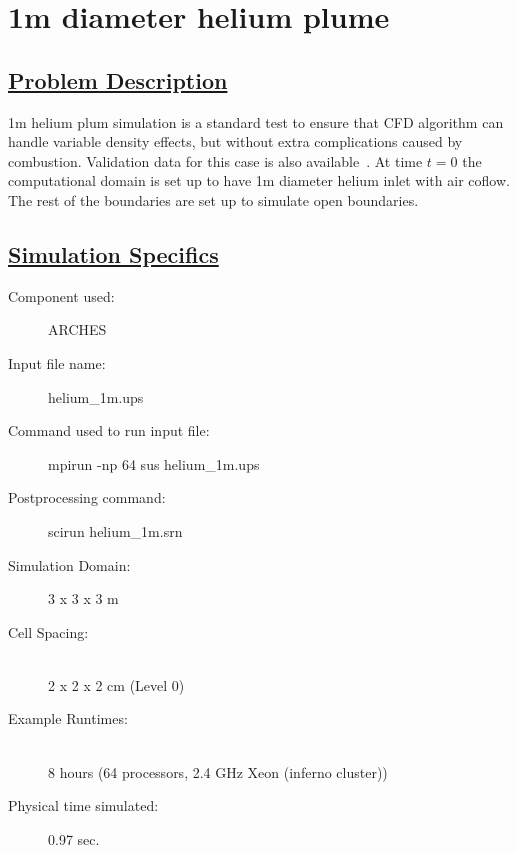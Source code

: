\documentclass[fleqn]{article}
\begin{document}
\section*{\center 1m diameter helium plume}
\subsection*{\underline{Problem Description}}
1m helium plum simulation is a standard test to ensure that CFD algorithm can handle variable density effects, but without extra complications caused by combustion. Validation data for this case is also available~\cite{desjardin}.  At time $t=0$ the computational domain is set up to have 1m diameter helium inlet with air coflow. The rest of the boundaries are set up to simulate open boundaries.
 
\subsection*{\underline{Simulation Specifics}}
\begin{description} 
\item [Component used:] \hfill ARCHES
\item [Input file name:] \hfill helium\_1m.ups
\item [Command used to run input file:]\hfill mpirun -np 64 sus helium\_1m.ups
\item [Postprocessing command:]\hfill scirun helium\_1m.srn

\item [Simulation Domain:]\hfill    3 x 3 x 3 m
\item [Cell Spacing:]\hfill \\ 
2 x 2 x 2 cm (Level 0)

\item [Example Runtimes:] \hfill \\
 8 hours   (64 processors, 2.4 GHz Xeon (inferno cluster))

\item [Physical time simulated:] \hfill 0.97 sec.

\end{description}
\end{document}
